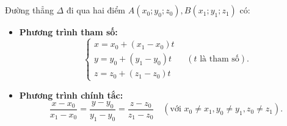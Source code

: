 \documentclass[12pt,a4paper]{extarticle}
\begin{document}
\subsection*{\color{myblue}{4. Lập phương trình đường thẳng đi qua hai điểm cho trước}}
Đường thẳng $\Delta$ đi qua hai điểm $A(x_0; y_0; z_0), B(x_1; y_1; z_1)$ có:
\begin{itemize}
    \item[\textbf{•}] \textbf{Phương trình tham số:} 
    \[
    \begin{cases}
    x = x_0 + (x_1 - x_0)t \\
    y = y_0 + (y_1 - y_0)t \\
    z = z_0 + (z_1 - z_0)t
    \end{cases} \quad (t \text{ là tham số}).
    \]
    \item[\textbf{•}] \textbf{Phương trình chính tắc:} 
    \[
    \frac{x - x_0}{x_1 - x_0} = \frac{y - y_0}{y_1 - y_0} = \frac{z - z_0}{z_1 - z_0} \quad (\text{với } x_0 \neq x_1, y_0 \neq y_1, z_0 \neq z_1).
    \]
\end{itemize}
\vspace{0.4cm}
\end{document}
